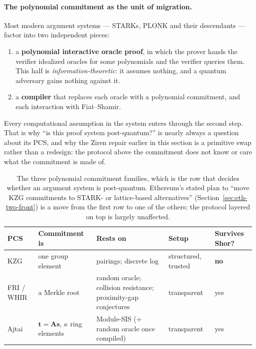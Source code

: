 \paragraph{The polynomial commitment as the unit of migration.}
Most modern argument systems --- STARKs, PLONK and their descendants
--- factor into two independent pieces:
\begin{enumerate}
  \item a \textbf{polynomial interactive oracle proof}, in which the prover hands
        the verifier idealized oracles for some polynomials and the verifier
        queries them. This half is \emph{information-theoretic}: it assumes
        nothing, and a quantum adversary gains nothing against it.
  \item a \textbf{compiler} that replaces each oracle with a polynomial
        commitment, and each interaction with Fiat--Shamir.
\end{enumerate}
Every computational assumption in the system enters through the second step.
That is why ``is this proof system post-quantum?'' is nearly always a question
about its PCS, and why the Ziren repair earlier in this section is a primitive
swap rather than a redesign: the protocol above the commitment does not know or
care what the commitment is made of.

\begin{table}[H]
\centering
\small
\begin{tabular}{@{}p{2.3cm}p{3.5cm}p{3.4cm}p{2.2cm}p{2.4cm}@{}}
\toprule
PCS & Commitment is & Rests on & Setup & Survives Shor? \\
\midrule
KZG & one group element & pairings; discrete log & structured, trusted & \textbf{no} \\
FRI / WHIR & a Merkle root & random oracle; collision resistance; proximity-gap conjectures & transparent & yes \\
Ajtai & $\mathbf{t}=\mathbf{A}\mathbf{s}$, $\kappa$ ring elements & Module-SIS (+ random oracle once compiled) & transparent & yes \\
\bottomrule
\end{tabular}
\caption{The three polynomial commitment families, which is the row that decides
whether an argument system is post-quantum. Ethereum's stated plan to ``move KZG
commitments to STARK- or lattice-based alternatives'' (Section~\ref{sec:eth-two-front})
is a move from the first row to one of the others; the protocol layered on top is
largely unaffected.}
\label{tab:pcs-families}
\end{table}

